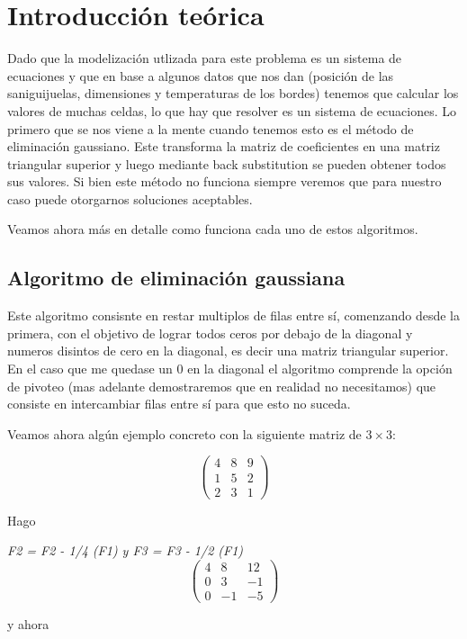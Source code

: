\section{Introducci\'on te\'orica}

Dado que la modelización utlizada para este problema es un sistema de ecuaciones y que en base a algunos datos que nos dan (posición de las saniguijuelas, dimensiones y temperaturas de los bordes) tenemos que calcular los valores de muchas celdas, lo que hay que resolver es un sistema de ecuaciones. 
Lo primero que se nos viene a la mente cuando tenemos esto es el método de eliminación gaussiano. Este transforma la matriz de coeficientes en una matriz triangular superior y luego mediante back substitution 
se pueden obtener todos sus valores. Si bien este método no funciona siempre veremos que para nuestro caso puede otorgarnos soluciones aceptables.

Veamos ahora más en detalle como funciona cada uno de estos algoritmos.

\subsection{Algoritmo de eliminación gaussiana}

Este algoritmo consisnte en restar multiplos de filas entre sí, comenzando desde la primera, con el objetivo de lograr todos ceros por debajo de la diagonal y numeros disintos de cero en la diagonal, 
es decir una matriz triangular superior. En el caso que me quedase un 0 en la diagonal el algoritmo comprende la opción de pivoteo (mas adelante demostraremos que en realidad no necesitamos) que consiste en intercambiar 
filas entre sí para que esto no suceda.

Veamos ahora algún ejemplo concreto con la siguiente matriz de $3 \times 3$:

\[ \left( \begin{array}{ccc}
4 & 8 & 9 \\
1 & 5 & 2 \\
2 & 3 & 1 \end{array} \right)\] 

Hago 

\emph{F2 = F2 - 1/4 (F1) y F3 = F3 - 1/2 (F1)} 
\[ \left( \begin{array}{ccc}
4 & 8 & 12 \\
0 & 3 & -1 \\
0 & -1 & -5 \end{array} \right)\] 

y ahora

